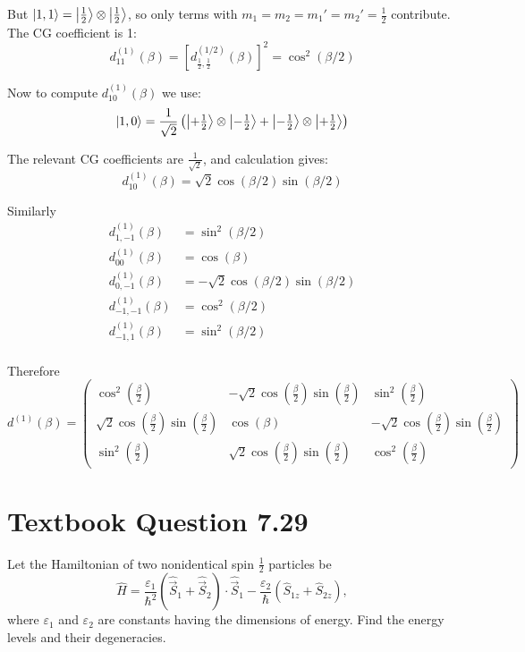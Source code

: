 \documentclass[12pt]{article}
\begin{document}
        But \( \ket{1,1} = \ket{\tfrac{1}{2}} \otimes \ket{\tfrac{1}{2}} \), so only terms with \( m_1 = m_2 = m_1' = m_2' = \tfrac{1}{2} \) contribute. The CG coefficient is 1:
        \[
            d^{(1)}_{11}(\beta) = \left[d^{(1/2)}_{\tfrac{1}{2}, \tfrac{1}{2}}(\beta)\right]^2 = \cos^2(\beta/2)
        \]
        
        Now to compute \( d^{(1)}_{10}(\beta) \) we use:
        \[
            \ket{1, 0} = \frac{1}{\sqrt{2}} \left( \ket{+\tfrac{1}{2}} \otimes \ket{-\tfrac{1}{2}} + \ket{-\tfrac{1}{2}} \otimes \ket{+\tfrac{1}{2}} \right)
        \]

        The relevant CG coefficients are \( \frac{1}{\sqrt{2}} \), and calculation gives:
        \[
        d^{(1)}_{10}(\beta) = \sqrt{2} \cos(\beta/2) \sin(\beta/2)
        \]

        Similarly
        \[
            \begin{aligned}
                d^{(1)}_{1,-1}(\beta) &= \sin^2(\beta/2) \\
                d^{(1)}_{00}(\beta) &= \cos(\beta) \\
                d^{(1)}_{0,-1}(\beta) &= -\sqrt{2} \cos(\beta/2) \sin(\beta/2) \\
                d^{(1)}_{-1,-1}(\beta) &= \cos^2(\beta/2) \\
                d^{(1)}_{-1,1}(\beta) &= \sin^2(\beta/2) \\
            \end{aligned}
        \]

        Therefore
        \[
            d^{(1)}(\beta) = 
            \begin{pmatrix}
                \cos^2\left( \frac{\beta}{2} \right) & -\sqrt{2} \cos\left( \frac{\beta}{2} \right)\sin\left( \frac{\beta}{2} \right) & \sin^2\left( \frac{\beta}{2} \right) \\
                \sqrt{2} \cos\left( \frac{\beta}{2} \right)\sin\left( \frac{\beta}{2} \right) & \cos(\beta) & -\sqrt{2} \cos\left( \frac{\beta}{2} \right)\sin\left( \frac{\beta}{2} \right) \\
                \sin^2\left( \frac{\beta}{2} \right) & \sqrt{2} \cos\left( \frac{\beta}{2} \right)\sin\left( \frac{\beta}{2} \right) & \cos^2\left( \frac{\beta}{2} \right)
            \end{pmatrix}
        \]

\section{Textbook Question 7.29}
    Let the Hamiltonian of two nonidentical spin \( \tfrac{1}{2} \) particles be
    \[
        \hat{H} = \frac{\varepsilon_1}{\hbar^2} \left( \hat{\vec{S}}_1 + \hat{\vec{S}}_2 \right) \cdot \hat{\vec{S}}_1
        - \frac{\varepsilon_2}{\hbar} \left( \hat{S}_{1z} + \hat{S}_{2z} \right),
    \]
    where \( \varepsilon_1 \) and \( \varepsilon_2 \) are constants having the dimensions of energy. Find the energy levels and their degeneracies.
    
\end{document}
